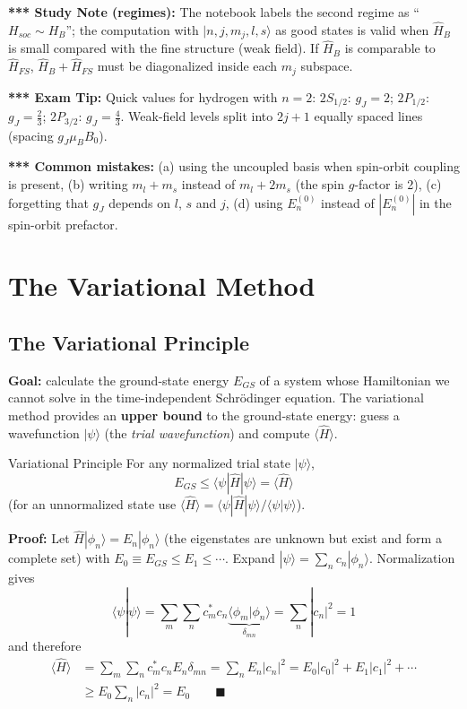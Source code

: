 \documentclass[11pt,a4paper]{article}
\begin{document}
\textbf{*** Study Note (regimes):} The notebook labels the second regime as ``$H_{soc}\sim H_B$''; the computation with $|n,j,m_j,l,s\rangle$ as good states is valid when $\hat H_B$ is small compared with the fine structure (weak field). If $\hat H_B$ is comparable to $\hat H_{FS}$, $\hat H_B+\hat H_{FS}$ must be diagonalized inside each $m_j$ subspace.

\textbf{*** Exam Tip:} Quick values for hydrogen with $n=2$: $2S_{1/2}$: $g_J=2$; $2P_{1/2}$: $g_J=\frac23$; $2P_{3/2}$: $g_J=\frac43$. Weak-field levels split into $2j+1$ equally spaced lines (spacing $g_J\mu_BB_0$).

\textbf{*** Common mistakes:} (a) using the uncoupled basis when spin-orbit coupling is present, (b) writing $m_l+m_s$ instead of $m_l+2m_s$ (the spin $g$-factor is 2), (c) forgetting that $g_J$ depends on $l$, $s$ and $j$, (d) using $E_n^{(0)}$ instead of $|E_n^{(0)}|$ in the spin-orbit prefactor.

\section{The Variational Method}

\subsection{The Variational Principle}
\textbf{Goal:} calculate the ground-state energy $E_{GS}$ of a system whose Hamiltonian we cannot solve in the time-independent Schr\"odinger equation. The variational method provides an \textbf{upper bound} to the ground-state energy: guess a wavefunction $|\psi\rangle$ (the \textit{trial wavefunction}) and compute $\langle\hat H\rangle$.

\begin{thm}{Variational Principle}
For any normalized trial state $|\psi\rangle$,
\[
E_{GS} \le \langle\psi|\hat H|\psi\rangle = \langle\hat H\rangle
\]
(for an unnormalized state use $\langle\hat H\rangle = \langle\psi|\hat H|\psi\rangle/\langle\psi|\psi\rangle$).
\end{thm}
\textbf{Proof:} Let $\hat H|\phi_n\rangle = E_n|\phi_n\rangle$ (the eigenstates are unknown but exist and form a complete set) with $E_0\equiv E_{GS}\le E_1\le\cdots$. Expand $|\psi\rangle = \sum_nc_n|\phi_n\rangle$. Normalization gives
\[
\langle\psi|\psi\rangle = \sum_m\sum_nc_m^*c_n\underbrace{\langle\phi_m|\phi_n\rangle}_{\delta_{mn}} = \sum_n|c_n|^2 = 1
\]
and therefore
\begin{align*}
\langle\hat H\rangle &= \sum_m\sum_nc_m^*c_nE_n\delta_{mn} = \sum_nE_n|c_n|^2 = E_0|c_0|^2 + E_1|c_1|^2 + \cdots\\
&\ge E_0\sum_n|c_n|^2 = E_0 \qquad\blacksquare
\end{align*}
\end{document}
